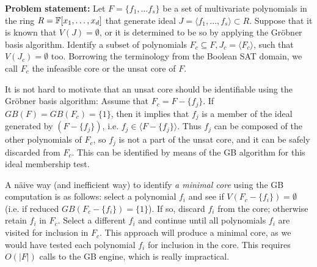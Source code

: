 \textbf{Problem statement: }
Let $F = \{f_1, \dots f_s\}$ be a set of multivariate polynomials in
the ring $R = {\mathbb{F}}[x_1,\dots,x_d]$ that generate ideal $J = \langle
f_1,\dots,f_s\rangle \subset R$. Suppose that it is known that $V(J) =
\emptyset$, or it is determined to be so by applying the Gr\"obner
basis algorithm. Identify a subset of polynomials $F_c \subseteq F,
J_c = \langle F_c \rangle$, such that $V(J_c) = \emptyset$
too. Borrowing the terminology from the Boolean SAT domain, we
call $F_c$ the infeasible core or the unsat core of $F$. 


It is not hard to motivate that an unsat core should be identifiable
using the Gr\"obner basis algorithm: Assume that $F_c=F-\{f_j\}$. If
$GB(F) = GB(F_c) = \{1\}$, then it implies that $f_j$ is a member of
the ideal generated by $(F - \{f_j\})$, i.e. $f_j \in \langle F -
\{f_j\}\rangle$. Thus $f_j$ can be composed of the other
polynomials of $F_c$, so $f_j$ is  not a part of the unsat core, and
it can be safely discarded from $F_c$. This can be identified by means
of the GB algorithm for this ideal membership test.%

A n\"aive way (and inefficient way) to identify {\it a minimal core}
using the GB computation is as follows:
select a polynomial $f_i$ and see if $V(F_c - \{f_i\}) = \emptyset$
(i.e. if reduced $GB(F_c - \{f_i\}) = \{1\}$). If so, discard $f_i$
from the core; otherwise retain $f_i$ in $F_c$. Select a different
$f_i$ and continue until all polynomials $f_i$ are visited for
inclusion in $F_c$. This approach will produce a minimal core, as we
would have tested each polynomial $f_i$ for inclusion in the
core. This requires $O(|F|)$ calls to the GB engine, which is really
impractical.   

